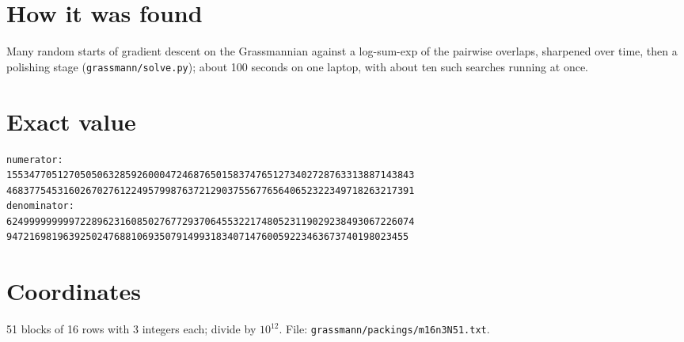 \documentclass[11pt,a4paper]{article}
\begin{document}
\section{How it was found}
Many random starts of gradient descent on the Grassmannian against a log-sum-exp of the pairwise overlaps, sharpened over time, then a polishing stage (\texttt{grassmann/solve.py}); about 100 seconds on one laptop, with about ten such searches running at once.


\appendix
\section{Exact value}
{\small
\begin{verbatim}
numerator:
155347705127050506328592600047246876501583747651273402728763313887143843
468377545316026702761224957998763721290375567765640652322349718263217391
denominator:
624999999999722896231608502767729370645532217480523119029238493067226074
94721698196392502476881069350791499318340714760059223463673740198023455
\end{verbatim}}

\section{Coordinates}
51 blocks of 16 rows with 3 integers each; divide by $10^{12}$. File: \texttt{grassmann/packings/m16n3N51.txt}.
{\tiny
\begin{multicols}{3}
\end{multicols}}
\end{document}
